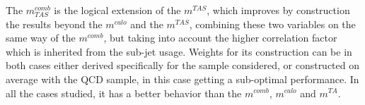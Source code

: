\documentclass[UKenglish,texlive=2013]{\ATLASLATEXPATH atlasdoc}
\newcommand{\mta}{m^{TA}}
\newcommand{\mtas}{m^{TAS}}
\newcommand{\mcal}{m^{calo}}
\newcommand{\mcomb}{m^{comb}}
\newcommand{\mcombtas}{m^{comb}_{TAS}}
\begin{document}
The $\mcombtas$ is the logical extension of the $\mtas$, which improves by construction the results beyond the $\mcal$ and the $\mtas$, combining these two variables on the same way of the $\mcomb$, but taking into account the higher correlation factor which is inherited from the sub-jet usage.
Weights for its construction can be in both cases either derived specifically for the sample considered, or constructed on average with the QCD sample, in this case getting a sub-optimal performance. 
In all the cases studied, it has a better behavior than the $\mcomb$, $\mcal$ and $\mta$.






\end{document}
